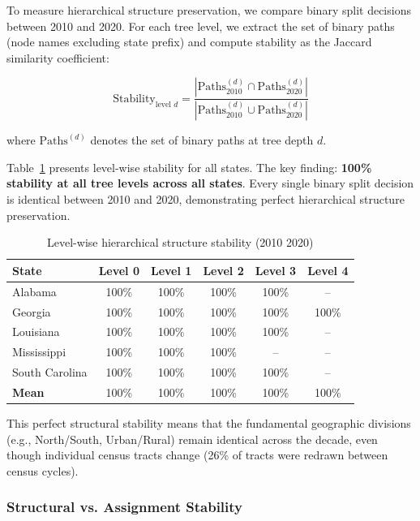 To measure hierarchical structure preservation, we compare binary split decisions between 2010 and 2020. For each tree level, we extract the set of binary paths (node names excluding state prefix) and compute stability as the Jaccard similarity coefficient:

\begin{equation}
\text{Stability}_{\text{level } d} = \frac{|\text{Paths}_{2010}^{(d)} \cap \text{Paths}_{2020}^{(d)}|}{|\text{Paths}_{2010}^{(d)} \cup \text{Paths}_{2020}^{(d)}|}
\end{equation}

where $\text{Paths}^{(d)}$ denotes the set of binary paths at tree depth $d$.

Table~\ref{tab:level-stability} presents level-wise stability for all states. The key finding: \textbf{100\% stability at all tree levels across all states}. Every single binary split decision is identical between 2010 and 2020, demonstrating perfect hierarchical structure preservation.

\begin{table}[htbp]
\centering
\caption{Level-wise hierarchical structure stability (2010 \textrightarrow{} 2020)}
\label{tab:level-stability}
\begin{tabular}{lccccc}
\toprule
\textbf{State} & \textbf{Level 0} & \textbf{Level 1} & \textbf{Level 2} & \textbf{Level 3} & \textbf{Level 4} \\
\midrule
Alabama        & 100\%   & 100\%   & 100\%   & 100\%   & --      \\
Georgia        & 100\%   & 100\%   & 100\%   & 100\%   & 100\%   \\
Louisiana      & 100\%   & 100\%   & 100\%   & 100\%   & --      \\
Mississippi    & 100\%   & 100\%   & 100\%   & --      & --      \\
South Carolina & 100\%   & 100\%   & 100\%   & 100\%   & --      \\
\midrule
\textbf{Mean}  & 100\%   & 100\%   & 100\%   & 100\%   & 100\%   \\
\bottomrule
\end{tabular}
\end{table}

This perfect structural stability means that the fundamental geographic divisions (e.g., North/South, Urban/Rural) remain identical across the decade, even though individual census tracts change (26\% of tracts were redrawn between census cycles).

\subsubsection{Structural vs. Assignment Stability}


